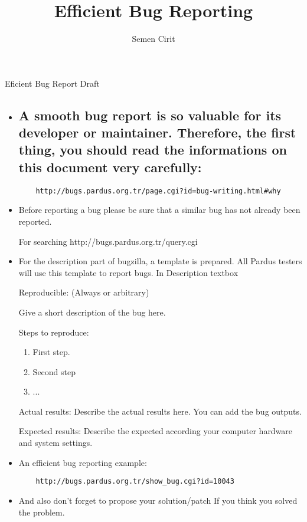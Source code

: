 \documentclass[a4paper,10pt]{article}
\title{Efficient Bug Reporting}
\author{Semen Cirit}
\begin{document}
\maketitle

Eficient Bug Report Draft

\begin{itemize}
 
  	\item \subsection*{A smooth bug report is so valuable for its developer or maintainer. Therefore, the first thing, you should read the informations on this document very carefully:}
	\begin{verbatim} 
 	http://bugs.pardus.org.tr/page.cgi?id=bug-writing.html#why
	\end{verbatim}

	\item Before reporting a bug please be sure that a similar bug has not already been reported.

	For searching http://bugs.pardus.org.tr/query.cgi
  	\item For the description part of bugzilla, a template is prepared. All Pardus testers will use this template to report bugs.
  	In Description textbox

   	Reproducible: (Always or arbitrary)	
   
    	Give a short description of the bug here.
   
   	Steps to reproduce:
   	\begin{enumerate}
    	\item First step.
    	\item Second step
    	\item ...
   	\end{enumerate}

	Actual results:
	Describe the actual results here. You can add the bug outputs.
	
	Expected results:
	Describe the expected according your computer hardware and system settings.
	
	\item An efficient bug reporting example:
	\begin{verbatim}
	http://bugs.pardus.org.tr/show_bug.cgi?id=10043
	\end{verbatim}
	\item And also don't forget to propose your solution/patch If you think you solved the problem.


\end{itemize}
\end{document}
